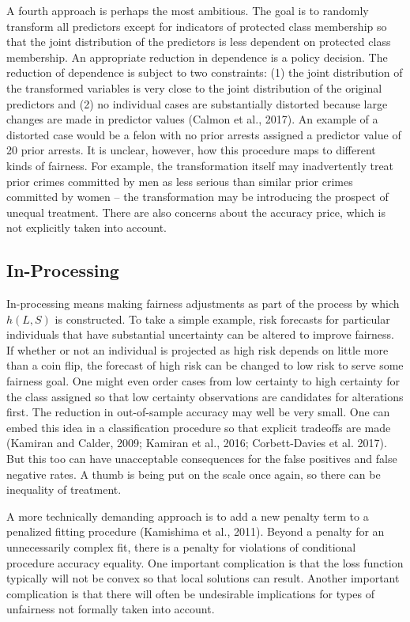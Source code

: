 \documentclass[12pt]{article}
\begin{document}
A fourth approach is perhaps the most ambitious. The goal is to randomly transform all predictors except for indicators of protected class membership so that the joint distribution of the predictors is less dependent on protected class membership. An appropriate reduction in dependence is a policy decision. The reduction of dependence is subject to two constraints: (1) the joint distribution of the transformed variables is very close to the joint distribution of the original predictors and (2) no individual cases are substantially distorted because large changes are made in predictor values (Calmon et al., 2017).  An example of a distorted case would be a felon with no prior arrests assigned a predictor value of 20 prior arrests. It is unclear, however, how this procedure maps to different kinds of fairness. For example, the transformation itself may inadvertently treat prior crimes committed by men as less serious than similar prior crimes committed by women -- the transformation may be introducing the prospect of unequal treatment. There are also concerns about the accuracy price, which is not explicitly taken into account. 

\subsection{In-Processing}

In-processing means making fairness adjustments as part of the process by which $h(L,S)$ is constructed. To take a simple example, risk forecasts for particular individuals that have substantial uncertainty can be altered to improve fairness. If whether or not an individual is projected as high risk depends on little more than a coin flip, the forecast of high risk can be changed to low risk to serve some fairness goal. One might even order cases from low certainty to high certainty for the class assigned so that low certainty observations are candidates for alterations first. The reduction in out-of-sample accuracy may well be very small. One can embed this idea in a classification procedure so that explicit tradeoffs are made (Kamiran and Calder, 2009; Kamiran et al., 2016; Corbett-Davies et al. 2017). But this too can have unacceptable consequences for the false positives and false negative rates. A thumb is being put on the scale once again, so there can be inequality of treatment.

A more technically demanding approach is to add a new penalty term to a penalized fitting procedure (Kamishima et al., 2011). Beyond a penalty for an unnecessarily complex fit, there is a penalty for violations of conditional procedure accuracy equality. One important complication is that the loss function typically will not be convex so that local solutions can result. Another important complication is that there will often be undesirable implications for types of unfairness not formally taken into account. 
\end{document}
